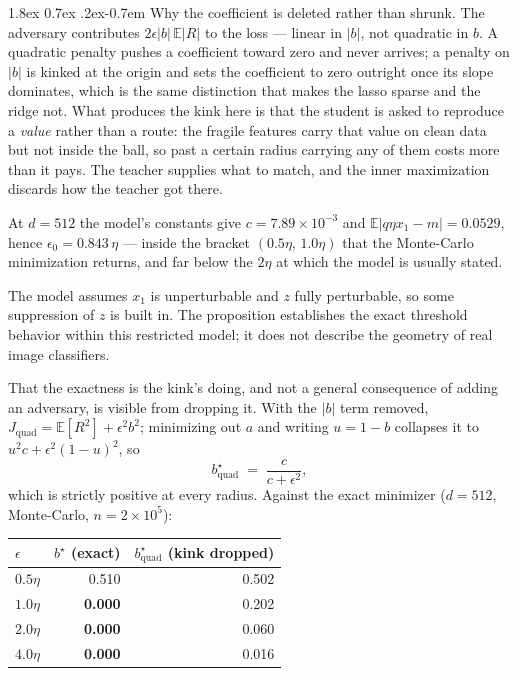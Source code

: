 \documentclass{article} %
\makeatletter
\theoremstyle{plain}
\renewcommand{\paragraph}{\@startsection{paragraph}{4}{\z@}%
  {1.8ex \@plus 0.7ex \@minus .2ex}{-0.7em}%
  {\normalfont\normalsize\bfseries}}
\makeatother
\begin{document}
\paragraph{Why the coefficient is deleted rather than shrunk.} The adversary contributes
$2\epsilon\lvert b\rvert\,\mathbb{E}\lvert R\rvert$ to the loss --- linear in $\lvert b\rvert$, not
quadratic in $b$. A quadratic penalty pushes a coefficient toward zero and never arrives; a penalty on
$\lvert b\rvert$ is kinked at the origin and sets the coefficient to zero outright once its slope
dominates, which is the same distinction that makes the lasso sparse and the ridge not. What produces
the kink here is that the student is asked to reproduce a \emph{value} rather than a route: the
fragile features carry that value on clean data but not inside the ball, so past a certain radius
carrying any of them costs more than it pays. The teacher supplies what to match, and the inner
maximization discards how the teacher got there.

At $d=512$ the model's constants give $c = 7.89\times10^{-3}$ and
$\mathbb{E}\lvert q\eta x_1 - m\rvert = 0.0529$, hence $\epsilon_0 = 0.843\,\eta$ --- inside the
bracket $(0.5\eta,\,1.0\eta)$ that the Monte-Carlo minimization returns, and far below the $2\eta$ at
which the model is usually stated.

The model assumes $x_1$ is unperturbable and $z$ fully perturbable, so some suppression of $z$ is
built in. The proposition establishes the exact threshold behavior within this restricted model;
it does not describe the geometry of real image classifiers.

That the exactness is the kink's doing, and not a general consequence of adding an adversary, is
visible from dropping it. With the $\lvert b\rvert$ term removed,
$J_{\mathrm{quad}} = \mathbb{E}[R^2] + \epsilon^2 b^2$; minimizing out $a$ and writing $u = 1-b$
collapses it to $u^2 c + \epsilon^2(1-u)^2$, so
\begin{equation}
b^\star_{\mathrm{quad}} \;=\; \frac{c}{c+\epsilon^2},
\label{eqn:bquad}
\end{equation}
which is strictly positive at every radius. Against the exact minimizer ($d=512$, Monte-Carlo,
$n = 2\times10^5$):

\begin{center}\small
\begin{tabular}{lrr}
  \toprule
  $\epsilon$ & $b^\star$ (exact) & $b^\star_{\mathrm{quad}}$ (kink dropped) \\
  \midrule
  $0.5\eta$ & 0.510 & 0.502 \\
  $1.0\eta$ & \textbf{0.000} & 0.202 \\
  $2.0\eta$ & \textbf{0.000} & 0.060 \\
  $4.0\eta$ & \textbf{0.000} & 0.016 \\
  \bottomrule
\end{tabular}
\end{center}
\end{document}
